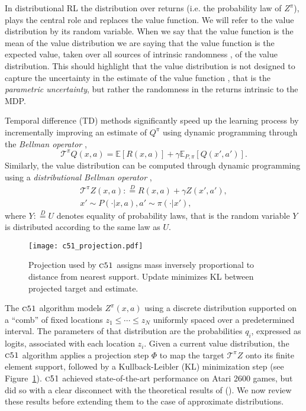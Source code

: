 \documentclass[letterpaper]{article}
\newcommand{\cT}{\mathcal{T}}
\def \cfo {\textsc{c51}}
\def \cTpi {\cT^\pi}
\newcommand{\citet}[1]{\citeauthor{#1} (\citeyear{#1})}
\begin{document}
In distributional RL the distribution over returns (i.e. the probability law of $Z^\pi$), plays the central role and replaces the value function. We will refer to the value distribution by its random variable. When we say that the value function is the mean of the value distribution we are saying that the value function is the expected value, taken over all sources of intrinsic randomness \cite{goldstein1981intrinsic}, of the value distribution. This should highlight that the value distribution is not designed to capture the uncertainty in the estimate of the value function \cite{dearden98bayesian,engel05reinforcement}, that is the \textit{parametric uncertainty}, but rather the randomness in the returns intrinsic to the MDP.

Temporal difference (TD) methods significantly speed up the learning process by incrementally improving an estimate of $Q^\pi$ using dynamic programming through the \textit{Bellman operator} \cite{bellman57dynamic},
\begin{equation}
    \nonumber \cTpi Q(x, a) = \mathbb{E} \left[ R(x, a) \right] + \gamma \mathbb{E}_{P, \pi} \left[ Q(x', a') \right].
\end{equation}
Similarly, the value distribution can be computed through dynamic programming using a \textit{distributional Bellman operator} \cite{c51},
\begin{eqnarray}
    \cTpi Z(x, a) :\overset{D}{=} R(x, a) + \gamma Z(x', a'),\\
    \nonumber x' \sim P(\cdot | x, a), a' \sim \pi(\cdot | x'),
\end{eqnarray}
where $Y :\overset{D}{=} U$ denotes equality of probability laws, that is the random variable $Y$ is distributed according to the same law as $U$.

\begin{figure}[t]
\begin{center}
\texttt{[image: c51\_projection.pdf]}
\end{center}
\caption{Projection used by $\cfo$ assigns mass inversely proportional to distance from nearest support. Update minimizes KL between projected target and estimate.\label{fig:c51proj}}
\end{figure}

The $\cfo$ algorithm models $Z^\pi(x,a)$ using a discrete distribution supported on a ``comb'' of fixed locations $z_1 \leq \cdots \leq z_N$ uniformly spaced over a predetermined interval. The parameters of that distribution are the probabilities $q_i$, expressed as logits, associated with each location $z_i$. Given a current value distribution, the $\cfo$ algorithm applies a projection step $\Phi$ to map the target $\cTpi Z$ onto its finite element support, followed by a Kullback-Leibler (KL) minimization step (see Figure~\ref{fig:c51proj}). $\cfo$ achieved state-of-the-art performance on Atari 2600 games, but did so with a clear disconnect with the theoretical results of \citet{c51}. We now review these results before extending them to the case of approximate distributions.
\end{document}
